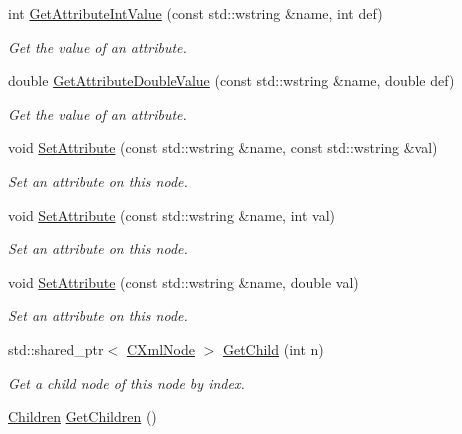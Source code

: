 \begin{DoxyCompactItemize}
int \mbox{\hyperlink{classxmlnode_1_1_c_xml_node_a870618bd8862b8f3834613f469e56d25}{Get\+Attribute\+Int\+Value}} (const std\+::wstring \&name, int def)
\begin{DoxyCompactList}\small\item\em Get the value of an attribute. \end{DoxyCompactList}\item 
double \mbox{\hyperlink{classxmlnode_1_1_c_xml_node_a69fcfbe75f19450db6fe72908ce7c52e}{Get\+Attribute\+Double\+Value}} (const std\+::wstring \&name, double def)
\begin{DoxyCompactList}\small\item\em Get the value of an attribute. \end{DoxyCompactList}\item 
void \mbox{\hyperlink{classxmlnode_1_1_c_xml_node_ac2543c8908d29642f70c9ce437475bf1}{Set\+Attribute}} (const std\+::wstring \&name, const std\+::wstring \&val)
\begin{DoxyCompactList}\small\item\em Set an attribute on this node. \end{DoxyCompactList}\item 
void \mbox{\hyperlink{classxmlnode_1_1_c_xml_node_a6771d1de541ffefcf8a4fcd809b12b62}{Set\+Attribute}} (const std\+::wstring \&name, int val)
\begin{DoxyCompactList}\small\item\em Set an attribute on this node. \end{DoxyCompactList}\item 
void \mbox{\hyperlink{classxmlnode_1_1_c_xml_node_a1bfd97eb8de5e6f769b5ed29039b91ea}{Set\+Attribute}} (const std\+::wstring \&name, double val)
\begin{DoxyCompactList}\small\item\em Set an attribute on this node. \end{DoxyCompactList}\item 
std\+::shared\+\_\+ptr$<$ \mbox{\hyperlink{classxmlnode_1_1_c_xml_node}{C\+Xml\+Node}} $>$ \mbox{\hyperlink{classxmlnode_1_1_c_xml_node_ac5700bda1faebcbe5bb042e043ea60be}{Get\+Child}} (int n)
\begin{DoxyCompactList}\small\item\em Get a child node of this node by index. \end{DoxyCompactList}\item 
\mbox{\hyperlink{classxmlnode_1_1_c_xml_node_1_1_children}{Children}} \mbox{\hyperlink{classxmlnode_1_1_c_xml_node_a03f86570ca40d4cc09c3e1841939a9d0}{Get\+Children}} ()

\end{DoxyCompactItemize}
